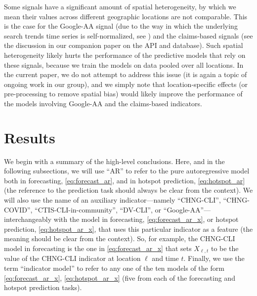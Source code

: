 \documentclass[9pt,twocolumn,twoside,lineno]{pnas-new}
\begin{document}
Some signals have a significant amount of spatial heterogeneity, by which we
mean their values across different geographic locations are not comparable.
This is the case for the Google-AA signal (due to the way in which the
underlying search trends time series is self-normalized, see
\cite{GoogleSymptoms}) and the claims-based signals (see the discussion in our
companion paper on the API and database).  Such spatial heterogeneity likely
hurts the performance of the predictive models that rely on these signals,
because we train the models on data pooled over all locations.  In the current
paper, we do not attempt to address this issue (it is again a topic of ongoing
work in our group), and we simply note that location-specific effects (or
pre-processing to remove spatial bias) would likely improve the performance of
the models involving Google-AA and the claims-based indicators.

\section{Results}

We begin with a summary of the high-level conclusions.  Here, and in the
following subsections, we will use ``AR'' to refer to the pure autoregressive
model both in forecasting, \eqref{eq:forecast_ar}, and in hotspot prediction,
\eqref{eq:hotspot_ar} (the reference to the prediction task should always be
clear from the context). We will also use the name of an auxiliary
indicator---namely ``CHNG-CLI'',  ``CHNG-COVID'', ``CTIS-CLI-in-community'',
``DV-CLI'', or ``Google-AA''---interchangeably with the model in forecasting, 
\eqref{eq:forecast_ar_x}, or hotspot prediction, \eqref{eq:hotspot_ar_x}, that
uses this particular indicator as a feature (the meaning should be clear from
the context).  So, for example, the CHNG-CLI model in forecasting is the one in  
\eqref{eq:forecast_ar_x} that sets $X_{\ell,t}$ to be the value of the CHNG-CLI 
indicator at location $\ell$ and time $t$.
Finally, we use the term ``indicator model'' to refer to any one of the ten
models of the form \eqref{eq:forecast_ar_x}, \eqref{eq:hotspot_ar_x} (five from
each of the forecasting and hotspot prediction tasks).
\end{document}
